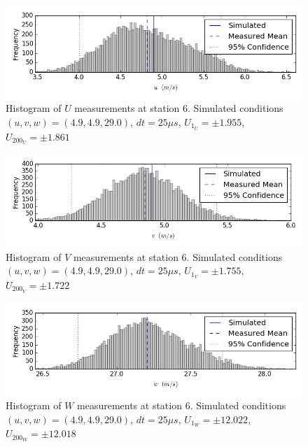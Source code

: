 \begin{figure}[H]
\centering
\includegraphics[width=6in]{figs/Ely_May28th06001/uncertainty_Ely_May28th06001_U}
\caption{Histogram of $U$ measurements at station 6. Simulated conditions $(u,v,w)=(4.9, 4.9, 29.0)$, $dt=25 \mu s$, $U_{1_{U}}=\pm 1.955$, $U_{200_{U}}=\pm 1.861$}
\label{fig:uncertainty_Ely_May28th06001_U}
\end{figure}


\begin{figure}[H]
\centering
\includegraphics[width=6in]{figs/Ely_May28th06001/uncertainty_Ely_May28th06001_V}
\caption{Histogram of $V$ measurements at station 6. Simulated conditions $(u,v,w)=(4.9, 4.9, 29.0)$, $dt=25 \mu s$, $U_{1_{V}}=\pm 1.755$, $U_{200_{V}}=\pm 1.722$}
\label{fig:uncertainty_Ely_May28th06001_V}
\end{figure}


\begin{figure}[H]
\centering
\includegraphics[width=6in]{figs/Ely_May28th06001/uncertainty_Ely_May28th06001_W}
\caption{Histogram of $W$ measurements at station 6. Simulated conditions $(u,v,w)=(4.9, 4.9, 29.0)$, $dt=25 \mu s$, $U_{1_{W}}=\pm 12.022$, $U_{200_{W}}=\pm 12.018$}
\label{fig:uncertainty_Ely_May28th06001_W}
\end{figure}


